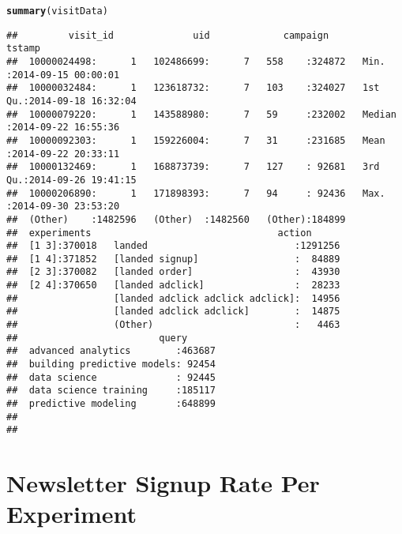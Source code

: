 \documentclass{article}\usepackage[]{graphicx}\usepackage[]{color}
\makeatletter
\newcommand{\hlstd}[1]{\textcolor[rgb]{0.345,0.345,0.345}{#1}}%
\newcommand{\hlkwd}[1]{\textcolor[rgb]{0.737,0.353,0.396}{\textbf{#1}}}%
\newenvironment{kframe}{%
 \def\at@end@of@kframe{}%
 \ifinner\ifhmode%
  \def\at@end@of@kframe{\end{minipage}}%
  \begin{minipage}{\columnwidth}%
 \fi\fi%
 \def\FrameCommand##1{\hskip\@totalleftmargin \hskip-\fboxsep
 \colorbox{shadecolor}{##1}\hskip-\fboxsep
     \hskip-\linewidth \hskip-\@totalleftmargin \hskip\columnwidth}%
 \MakeFramed {\advance\hsize-\width
   \@totalleftmargin\z@ \linewidth\hsize
   \@setminipage}}%
 {\par\unskip\endMakeFramed%
 \at@end@of@kframe}
\newenvironment{knitrout}{}{} %
\makeatother
\begin{document}
\begin{knitrout}
\color{fgcolor}\begin{kframe}
\begin{alltt}
\hlkwd{summary}\hlstd{(visitData)}
\end{alltt}
\begin{verbatim}
##         visit_id              uid             campaign          tstamp                   
##  10000024498:      1   102486699:      7   558    :324872   Min.   :2014-09-15 00:00:01  
##  10000032484:      1   123618732:      7   103    :324027   1st Qu.:2014-09-18 16:32:04  
##  10000079220:      1   143588980:      7   59     :232002   Median :2014-09-22 16:55:36  
##  10000092303:      1   159226004:      7   31     :231685   Mean   :2014-09-22 20:33:11  
##  10000132469:      1   168873739:      7   127    : 92681   3rd Qu.:2014-09-26 19:41:15  
##  10000206890:      1   171898393:      7   94     : 92436   Max.   :2014-09-30 23:53:20  
##  (Other)    :1482596   (Other)  :1482560   (Other):184899                                
##  experiments                                 action       
##  [1 3]:370018   landed                          :1291256  
##  [1 4]:371852   [landed signup]                 :  84889  
##  [2 3]:370082   [landed order]                  :  43930  
##  [2 4]:370650   [landed adclick]                :  28233  
##                 [landed adclick adclick adclick]:  14956  
##                 [landed adclick adclick]        :  14875  
##                 (Other)                         :   4463  
##                         query       
##  advanced analytics        :463687  
##  building predictive models: 92454  
##  data science              : 92445  
##  data science training     :185117  
##  predictive modeling       :648899  
##                                     
## 
\end{verbatim}
\end{kframe}
\end{knitrout}

\section{Newsletter Signup Rate Per Experiment}
\end{document}
